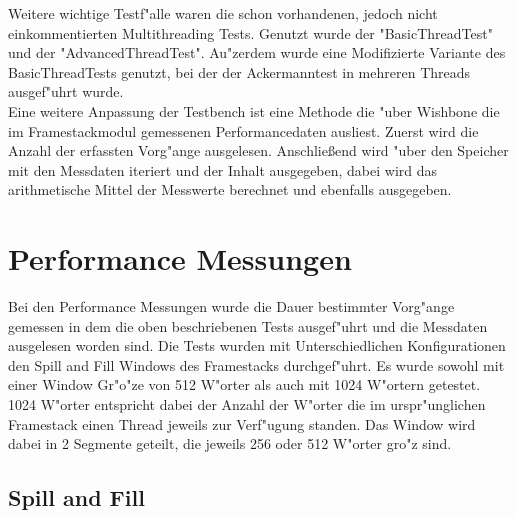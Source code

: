 			
Weitere wichtige Testf"alle waren die schon vorhandenen, jedoch nicht einkommentierten Multithreading Tests. Genutzt wurde der "BasicThreadTest" und der "AdvancedThreadTest". Au"zerdem wurde eine Modifizierte Variante des BasicThreadTests genutzt, bei der der Ackermanntest in mehreren Threads ausgef"uhrt wurde. \\

Eine weitere Anpassung der Testbench ist eine Methode die "uber Wishbone die im Framestackmodul gemessenen Performancedaten ausliest.  Zuerst wird die Anzahl der erfassten Vorg"ange ausgelesen. Anschließend wird "uber den Speicher mit den Messdaten iteriert und der Inhalt ausgegeben, dabei wird das arithmetische Mittel der Messwerte berechnet und ebenfalls ausgegeben. 


\section{Performance Messungen}
Bei den Performance Messungen wurde die Dauer bestimmter Vorg"ange gemessen in dem die oben beschriebenen Tests ausgef"uhrt und die Messdaten ausgelesen worden sind. 
Die Tests wurden mit Unterschiedlichen Konfigurationen den Spill and Fill Windows des Framestacks durchgef"uhrt. Es wurde sowohl mit einer Window Gr"o"ze von 512 W"orter als auch mit 1024 W"ortern getestet. 1024 W"orter entspricht dabei der Anzahl der W"orter die im urspr"unglichen Framestack einen Thread jeweils zur Verf"ugung standen. Das Window wird dabei in 2 Segmente geteilt, die jeweils 256 oder 512 W"orter gro"z sind.




\subsection{Spill and Fill}

